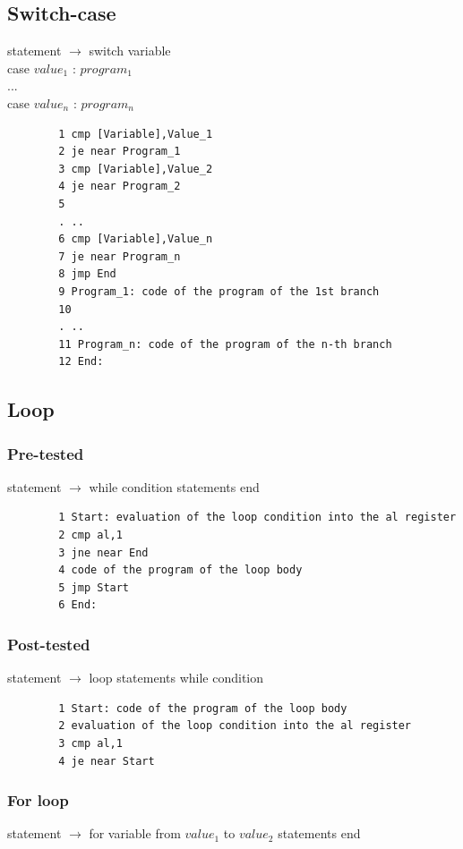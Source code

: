 \documentclass[margin=0px]{article}
\begin{document}
\subsection{Switch-case}
statement $ \rightarrow $ switch variable
\\case $ value_1 $ : $ program_1 $
\\...
\\case $ value_n $ : $ program_n $

\begin{verbatim}
		1 cmp [Variable],Value_1
		2 je near Program_1
		3 cmp [Variable],Value_2
		4 je near Program_2
		5
		. ..
		6 cmp [Variable],Value_n
		7 je near Program_n
		8 jmp End
		9 Program_1: code of the program of the 1st branch
		10
		. ..
		11 Program_n: code of the program of the n-th branch
		12 End:
	\end{verbatim}

\subsection{Loop}
\subsubsection{Pre-tested}
statement $ \rightarrow $ while condition statements end

\begin{verbatim}
		1 Start: evaluation of the loop condition into the al register
		2 cmp al,1
		3 jne near End
		4 code of the program of the loop body
		5 jmp Start
		6 End:
	\end{verbatim}


\subsubsection{Post-tested}
statement $ \rightarrow $ loop statements while condition


\begin{verbatim}
		1 Start: code of the program of the loop body
		2 evaluation of the loop condition into the al register
		3 cmp al,1
		4 je near Start
	\end{verbatim}

\subsubsection{For loop}

statement $ \rightarrow $ for variable from $ value_1 $ to $ value_2 $ statements end
\end{document}
